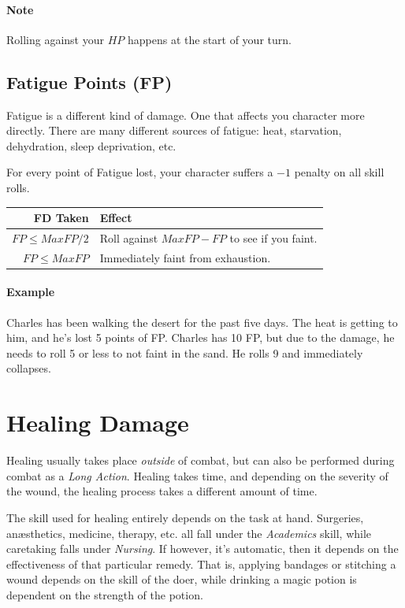 \paragraph{Note} Rolling against your $HP$ happens at the start of your turn.
  
\subsection{Fatigue Points (FP)}\label{sec:fatigue-points}
Fatigue is a different kind of damage.
One that affects you character more directly.
There are many different sources of fatigue: heat, starvation, dehydration, sleep deprivation, etc.

For every point of Fatigue lost, your character suffers a $-1$ penalty on all skill rolls.

\begin{center}
  \begin{tabular}{r | l}
    \textbf{FD Taken} & \textbf{Effect} \\\hline
    $FP \leq MaxFP/2$ & Roll against $MaxFP - FP$ to see if you faint. \\
    $FP \leq MaxFP$   & Immediately faint from exhaustion.
  \end{tabular}
\end{center}

\paragraph{Example} Charles has been walking the desert for the past five days.
The heat is getting to him, and he's lost 5 points of FP.
Charles has 10 FP, but due to the damage, he needs to roll 5 or less to not faint in the sand.
He rolls 9 and immediately collapses.

\section{Healing Damage}
Healing usually takes place \textit{outside} of combat, but can also be performed during combat as a \textit{Long Action}.
Healing takes time, and depending on the severity of the wound, the healing process takes a different amount of time.

The skill used for healing entirely depends on the task at hand.
Surgeries, anæsthetics, medicine, therapy, etc. all fall under the \textit{Academics} skill, while caretaking falls under \textit{Nursing}.
If however, it's automatic, then it depends on the effectiveness of that particular remedy.
That is, applying bandages or stitching a wound depends on the skill of the doer, while drinking a magic potion is dependent on the strength of the potion.

